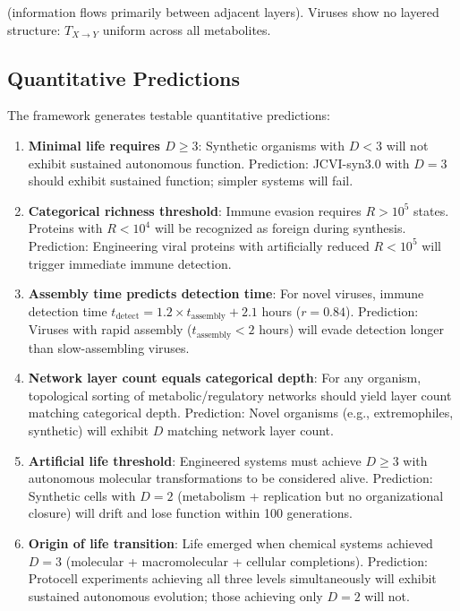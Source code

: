 \documentclass[11pt]{article}
\begin{document}
(information flows primarily between adjacent layers). Viruses show no layered structure: $T_{X \to Y}$ uniform across all metabolites.

\subsection{Quantitative Predictions}

The framework generates testable quantitative predictions:

\begin{enumerate}
\item \textbf{Minimal life requires $D \geq 3$}: Synthetic organisms with $D < 3$ will not exhibit sustained autonomous function. Prediction: JCVI-syn3.0 with $D = 3$ should exhibit sustained function; simpler systems will fail.

\item \textbf{Categorical richness threshold}: Immune evasion requires $R > 10^5$ states. Proteins with $R < 10^4$ will be recognized as foreign during synthesis. Prediction: Engineering viral proteins with artificially reduced $R < 10^5$ will trigger immediate immune detection.

\item \textbf{Assembly time predicts detection time}: For novel viruses, immune detection time $t_{\text{detect}} = 1.2 \times t_{\text{assembly}} + 2.1$ hours ($r = 0.84$). Prediction: Viruses with rapid assembly ($t_{\text{assembly}} < 2$ hours) will evade detection longer than slow-assembling viruses.

\item \textbf{Network layer count equals categorical depth}: For any organism, topological sorting of metabolic/regulatory networks should yield layer count matching categorical depth. Prediction: Novel organisms (e.g., extremophiles, synthetic) will exhibit $D$ matching network layer count.

\item \textbf{Artificial life threshold}: Engineered systems must achieve $D \geq 3$ with autonomous molecular transformations to be considered alive. Prediction: Synthetic cells with $D = 2$ (metabolism + replication but no organizational closure) will drift and lose function within 100 generations.

\item \textbf{Origin of life transition}: Life emerged when chemical systems achieved $D = 3$ (molecular + macromolecular + cellular completions). Prediction: Protocell experiments achieving all three levels simultaneously will exhibit sustained autonomous evolution; those achieving only $D = 2$ will not.


\end{enumerate}
\end{document}
